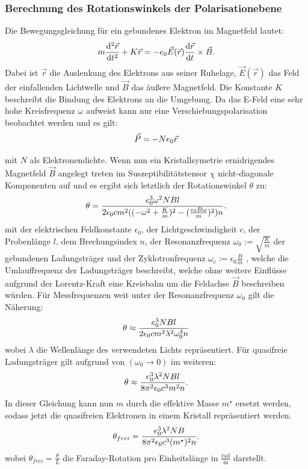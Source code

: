 \subsubsection{Berechnung des Rotationswinkels der Polarisationebene}
\label{sec:rotationsweinkel}
Die Bewegungsgleichung für ein gebundenes Elektron im Magnetfeld lautet:
\begin{equation*}
  m\frac{\mathrm{d}^2 \vec{r}}{\mathrm{d}t^2}+K\vec{r}=-e_0\vec{E}(\vec{r})\frac{\mathrm{d} \vec{r}}{\mathrm{d}t}\times \vec{B}.\\
\end{equation*}
Dabei ist $\vec{r}$ die Auslenkung des Elektrons aus seiner Ruhelage, $\vec{E}(\vec{r})$ das Feld der einfallenden Lichtwelle
und $\vec{B}$ das äußere Magnetfeld. Die Konstante $K$ beschreibt die Bindung des Elektrons an die Umgebung. Da das E-Feld eine
sehr hohe Kreisfrequenz $\omega$ aufweist kann nur eine Verschiebungspolarisation beobachtet werden und es gilt:
\begin{equation*}
  \vec{P}=-Ne_0 \vec{r}\\
\end{equation*} 

mit $N$ als Elektronendichte. Wenn nun ein Kristallsymetrie ernidrigendes Magnetfeld $\vec{B}$ angelegt treten im Suszeptibilitätstensor
$\chi$ nicht-diagonale Komponenten auf und es ergibt sich letztlich der Rotationswinkel $\theta$ zu:
\begin{equation*}
  \theta = \frac{e_0^3 \omega^2 NBl}{2\epsilon_0 cm^2((-\omega^2+\frac{K}{m})^2-(\frac{e_0B\omega}{m})^2)n}.\\
\end{equation*}
mit der elektrischen Feldkonstante $\epsilon_0$, der Lichtgeschwindigkeit $c$, der Probenlänge $l$, dem
Brechungsindex $n$, der Resonanzfrequenz $\omega_0:= \sqrt{\frac{K}{m}}$ der gebundenen Ladungsträger
und der Zyklotronfrequenz $\omega_c:=\epsilon_0\frac{B}{m}$ , welche die Umlauffrequenz der Ladungsträger
beschreibt, welche ohne weitere Einflüsse aufgrund der Lorentz-Kraft eine Kreisbahn um
die Feldachse $\vec{B}$ beschreiben würden. Für Messfrequenzen weit unter der Resonanzfrequenz
$\omega_0$ gilt die Näherung:
\begin{equation*}
  \theta \approx \frac{e_0^3 NBl}{2\epsilon_0cm^2\lambda^2\omega_0^4n}\\
\end{equation*}
wobei $\lambda$ die Wellenlänge des verwendeten Lichts repräsentiert. Für quasifreie Ladungsträger gilt aufgrund von $(\omega_0\rightarrow 0)$ im weiteren:
\begin{equation*}
  \theta \approx \frac{e_0^3\lambda^2NBl}{8\pi^2\epsilon_0c^3m^2n}.\\
\end{equation*}
In dieser Gleichung kann nun $m$ durch die effektive Masse $m^{\star}$ ersetzt werden, sodass jetzt  die quasifreien Elektronen in einem Kristall repräsentiert werden.
\begin{equation}
  \label{eq:thetafrei}
  \theta_{frei}=\frac{e_0^3\lambda^2NB}{8\pi^2\epsilon_0c^3(m^{\star})^2n}.\\
\end{equation}
wobei $\theta_{frei}=\frac{\theta}{L}$ die Faraday-Rotation pro Einheitslänge in $\frac{\mathrm{rad}}{\mathrm{m}}$ darstellt.
